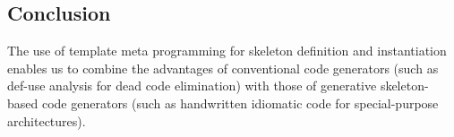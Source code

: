 % 
% 
% 


\subsection{Conclusion}

The use of template meta programming for skeleton definition and instantiation
enables us to combine the advantages of conventional code generators (such as
def-use analysis for dead code elimination) with those of generative
skeleton-based code generators (such as handwritten idiomatic code for
special-purpose architectures).

\endinput


\subsection{Let bindings}


